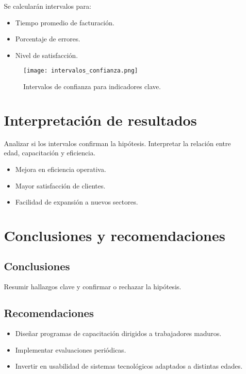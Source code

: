 \documentclass[12pt,a4paper]{report}
\begin{document}
Se calcularán intervalos para:
\begin{itemize}
    \item Tiempo promedio de facturación.
    \item Porcentaje de errores.
    \item Nivel de satisfacción.
\end{itemize}

\begin{figure}[H]
    \centering
    \texttt{[image: intervalos\_confianza.png]}
    \caption{Intervalos de confianza para indicadores clave.}
\end{figure}

\chapter{Interpretación de resultados}

Analizar si los intervalos confirman la hipótesis. Interpretar la relación entre edad, capacitación y eficiencia.

\begin{itemize}
    \item Mejora en eficiencia operativa.
    \item Mayor satisfacción de clientes.
    \item Facilidad de expansión a nuevos sectores.
\end{itemize}

\chapter{Conclusiones y recomendaciones}

\section*{Conclusiones}
Resumir hallazgos clave y confirmar o rechazar la hipótesis.

\section*{Recomendaciones}
\begin{itemize}
    \item Diseñar programas de capacitación dirigidos a trabajadores maduros.
    \item Implementar evaluaciones periódicas.
    \item Invertir en usabilidad de sistemas tecnológicos adaptados a distintas edades.
\end{itemize}
\end{document}
